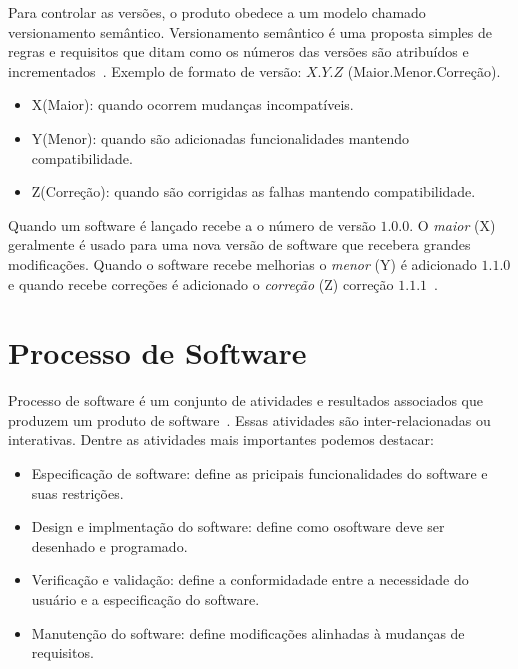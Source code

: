 Para controlar as versões, o produto obedece a um modelo chamado versionamento semântico.
Versionamento semântico é uma proposta simples de regras e requisitos que ditam como os números das versões são atribuídos e incrementados~\cite{palestino2015estudo}. 
Exemplo de formato de versão: $X.Y.Z$ (Maior.Menor.Correção).

\begin{itemize}
    \item X(Maior): quando ocorrem mudanças incompatíveis.
    \item Y(Menor): quando são adicionadas funcionalidades mantendo compatibilidade.  
    \item Z(Correção):  quando são corrigidas as falhas mantendo compatibilidade. 
    
\end{itemize}

Quando um software é lançado recebe a o número de versão $1.0.0$.
O \textit{maior} (X) geralmente é usado para uma nova versão de software que recebera grandes modificações.
Quando o software recebe melhorias o \textit{menor} (Y) é adicionado $1.1.0$ e quando recebe correções é adicionado o \textit{correção} (Z) correção $1.1.1$~\cite{versionamento}.


\section{Processo de Software}

Processo de software é um conjunto de atividades e resultados associados que produzem um produto de software~\cite{sommerville2007engenharia}.
Essas atividades são inter-relacionadas ou interativas.
Dentre as atividades mais importantes podemos destacar:

\begin{itemize}
	\item Especificação de software: define as pricipais funcionalidades do software e suas restrições.
	\item Design e implmentação do software: define como osoftware deve ser desenhado e programado.
	\item Verificação e validação: define a conformidadade entre a necessidade do usuário e a especificação do software.
	\item Manutenção do software: define modificações alinhadas à mudanças de requisitos.
\end{itemize}


